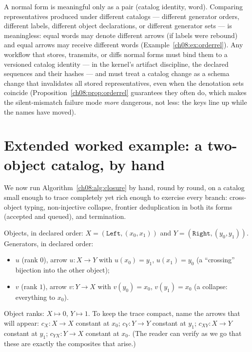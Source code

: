 \begin{boundary}\label{ch08:bd:catalogidentity}
A normal form is meaningful only as a pair (catalog identity, word).
Comparing representatives produced under different catalogs --- different
generator orders, different labels, different object declarations, or
different generator sets --- is meaningless: equal words may denote
different arrows (if labels were rebound) and equal arrows may receive
different words (Example~\ref{ch08:ex:orderrel}). Any workflow that stores,
transmits, or diffs normal forms must bind them to a versioned catalog
identity --- in the kernel's artifact discipline, the declared sequences and
their hashes --- and must treat a catalog change as a schema change that
invalidates all stored representatives, even when the denotation sets
coincide (Proposition~\ref{ch08:prop:orderrel} guarantees they often do,
which makes the silent-mismatch failure mode \emph{more} dangerous, not
less: the keys line up while the names have moved).
\end{boundary}

\section{Extended worked example: a two-object catalog, by hand}\label{ch08:sec:worked}

We now run Algorithm~\ref{ch08:alg:closure} by hand, round by round, on a
catalog small enough to trace completely yet rich enough to exercise every
branch: cross-object typing, non-injective collapse, frontier
deduplication in both its forms (accepted and queued), and termination.

\begin{example}\label{ch08:ex:workedcatalog}
Objects, in declared order:
$X=(\texttt{Left},(x_0,x_1))$ and $Y=(\texttt{Right},(y_0,y_1))$.
Generators, in declared order:
\begin{itemize}
\item $u$ (rank $0$), arrow $u:X\to Y$ with $u(x_0)=y_1$, $u(x_1)=y_0$
  (a ``crossing'' bijection into the other object);
\item $v$ (rank $1$), arrow $v:Y\to X$ with $v(y_0)=x_0$, $v(y_1)=x_0$
  (a collapse: everything to $x_0$).
\end{itemize}
Object ranks: $X\mapsto 0$, $Y\mapsto 1$. To keep the trace compact, name
the arrows that will appear:
$c_X:X\to X$ constant at $x_0$;
$c_Y:Y\to Y$ constant at $y_1$;
$c_{XY}:X\to Y$ constant at $y_1$;
$c_{YX}:Y\to X$ constant at $x_0$.
(The reader can verify as we go that these are exactly the composites that
arise.)
\end{example}

